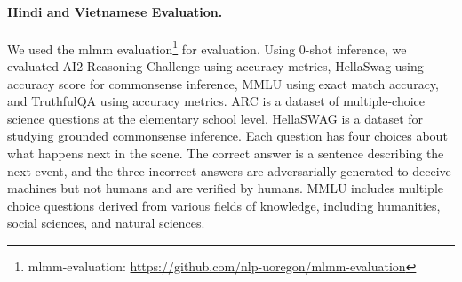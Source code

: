 
\paragraph{Hindi and Vietnamese Evaluation.}
We used the mlmm evaluation\footnote{mlmm-evaluation: \url{https://github.com/nlp-uoregon/mlmm-evaluation}} for evaluation. Using 0-shot inference, we evaluated AI2 Reasoning Challenge \citep{Clark2018ThinkYH} using accuracy metrics, HellaSwag using accuracy score for commonsense inference, MMLU \citep{hendrycks2021measuring} using exact match accuracy, and TruthfulQA \citep{lin-etal-2022-truthfulqa} using accuracy metrics. ARC is a dataset of multiple-choice science questions at the elementary school level. HellaSWAG is a dataset for studying grounded commonsense inference. Each question has four choices about what happens next in the scene. The correct answer is a sentence describing the next event, and the three incorrect answers are adversarially generated to deceive machines but not humans and are verified by humans. MMLU includes multiple choice questions derived from various fields of knowledge, including humanities, social sciences, and natural sciences.


